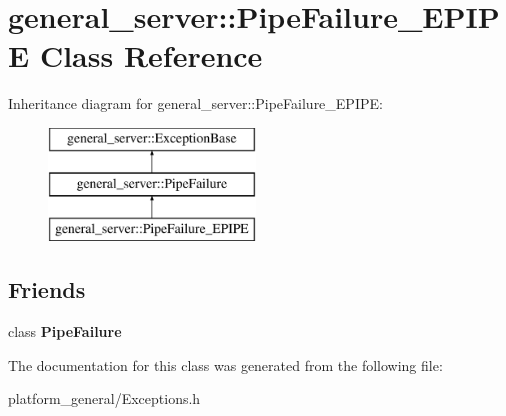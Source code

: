 \hypertarget{classgeneral__server_1_1PipeFailure__EPIPE}{\section{general\-\_\-server\-:\-:\-Pipe\-Failure\-\_\-\-E\-P\-I\-P\-E \-Class \-Reference}
\label{classgeneral__server_1_1PipeFailure__EPIPE}
}
\-Inheritance diagram for general\-\_\-server\-:\-:\-Pipe\-Failure\-\_\-\-E\-P\-I\-P\-E\-:\begin{figure}[H]
\begin{center}
\leavevmode
\includegraphics[height=3.000000cm]{classgeneral__server_1_1PipeFailure__EPIPE}
\end{center}
\end{figure}
\subsection*{\-Friends}
\begin{DoxyCompactItemize}
\item 
\hypertarget{classgeneral__server_1_1PipeFailure__EPIPE_a6b35978698e89f7e3f63b6db5a5366b6}{class {\bfseries \-Pipe\-Failure}}\label{classgeneral__server_1_1PipeFailure__EPIPE_a6b35978698e89f7e3f63b6db5a5366b6}

\end{DoxyCompactItemize}


\-The documentation for this class was generated from the following file\-:\begin{DoxyCompactItemize}
\item 
platform\-\_\-general/\-Exceptions.\-h\end{DoxyCompactItemize}
